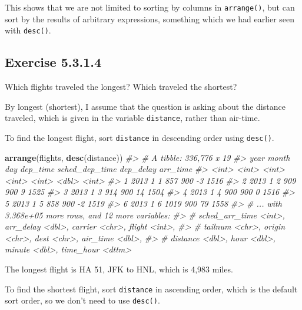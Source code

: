 \documentclass[]{book}
\newenvironment{Shaded}{\begin{snugshade}}{\end{snugshade}}
\newcommand{\CommentTok}[1]{\textcolor[rgb]{0.56,0.35,0.01}{\textit{#1}}}
\newcommand{\KeywordTok}[1]{\textcolor[rgb]{0.13,0.29,0.53}{\textbf{#1}}}
\newcommand{\NormalTok}[1]{#1}
\theoremstyle{plain}
\theoremstyle{remark}
\begin{document}
This shows that we are not limited to sorting by columns in
\texttt{arrange()}, but can sort by the results of arbitrary
expressions, something which we had earlier seen with \texttt{desc()}.

\hypertarget{exercise-5.3.1.4}{%
\subsection*{\texorpdfstring{Exercise
{5.3.1.4}}{Exercise 5.3.1.4}}\label{exercise-5.3.1.4}}

Which flights traveled the longest? Which traveled the shortest?

By longest (shortest), I assume that the question is asking about the
distance traveled, which is given in the variable \texttt{distance},
rather than air-time.

To find the longest flight, sort \texttt{distance} in descending order
using \texttt{desc()}.

\begin{Shaded}
\begin{Highlighting}[]
\KeywordTok{arrange}\NormalTok{(flights, }\KeywordTok{desc}\NormalTok{(distance))}
\CommentTok{#> # A tibble: 336,776 x 19}
\CommentTok{#>    year month   day dep_time sched_dep_time dep_delay arr_time}
\CommentTok{#>   <int> <int> <int>    <int>          <int>     <dbl>    <int>}
\CommentTok{#> 1  2013     1     1      857            900        -3     1516}
\CommentTok{#> 2  2013     1     2      909            900         9     1525}
\CommentTok{#> 3  2013     1     3      914            900        14     1504}
\CommentTok{#> 4  2013     1     4      900            900         0     1516}
\CommentTok{#> 5  2013     1     5      858            900        -2     1519}
\CommentTok{#> 6  2013     1     6     1019            900        79     1558}
\CommentTok{#> # ... with 3.368e+05 more rows, and 12 more variables:}
\CommentTok{#> #   sched_arr_time <int>, arr_delay <dbl>, carrier <chr>, flight <int>,}
\CommentTok{#> #   tailnum <chr>, origin <chr>, dest <chr>, air_time <dbl>,}
\CommentTok{#> #   distance <dbl>, hour <dbl>, minute <dbl>, time_hour <dttm>}
\end{Highlighting}
\end{Shaded}

The longest flight is HA 51, JFK to HNL, which is 4,983 miles.

To find the shortest flight, sort \texttt{distance} in ascending order,
which is the default sort order, so we don't need to use
\texttt{desc()}.
\end{document}
